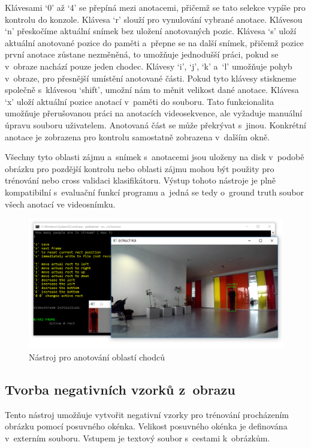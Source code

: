 Klávesami `0' až `4' se přepíná mezi anotacemi, přičemž se tato selekce vypíše pro kontrolu do konzole. Klávesa `r' slouží pro vynulování vybrané anotace. Klávesou `n' přeskočíme aktuální snímek bez uložení anotovaných pozic. Klávesa `s' uloží aktuální anotované pozice do paměti a~přepne se na další snímek, přičemž pozice první anotace zůstane nezměněná, to umožňuje jednodušší práci, pokud se v~obraze nachází pouze jeden chodec. Klávesy `i', `j', `k' a~`l' umožňuje pohyb v~obraze, pro přesnější umístění anotované části. Pokud tyto klávesy stiskneme společně s~klávesou `shift', umožní nám to měnit velikost dané anotace. Klávesa `x' uloží aktuální pozice anotací v~paměti do souboru. Tato funkcionalita umožňuje přerušovanou práci na anotacích videosekvence, ale vyžaduje manuální úpravu souboru uživatelem. Anotovaná část se může překrývat s~jinou. Konkrétní anotace je zobrazena pro kontrolu samostatně zobrazena v~dalším okně.

Všechny tyto oblasti zájmu a~snímek s~anotacemi jsou uloženy na disk v~podobě obrázku pro pozdější kontrolu nebo oblasti zájmu mohou být použity pro trénování nebo cross validaci klasifikátoru. Výstup tohoto nástroje je plně kompatibilní s~evaluační funkcí programu a~jedná se tedy o~ground truth soubor všech anotací ve videosnímku.
 \begin{figure}[H]
\centering
\includegraphics[width=13.5cm]{figures/annotation_example}
\caption{Nástroj pro anotování oblastí chodců}
\label{tool_anotate}
\end{figure}

\subsection{Tvorba negativních vzorků z~obrazu}
Tento nástroj umožňuje vytvořit negativní vzorky pro trénování procházením obrázku pomocí posuvného okénka. Velikost posuvného okénka je definována v~externím souboru. Vstupem je textový soubor s~cestami k~obrázkům.
